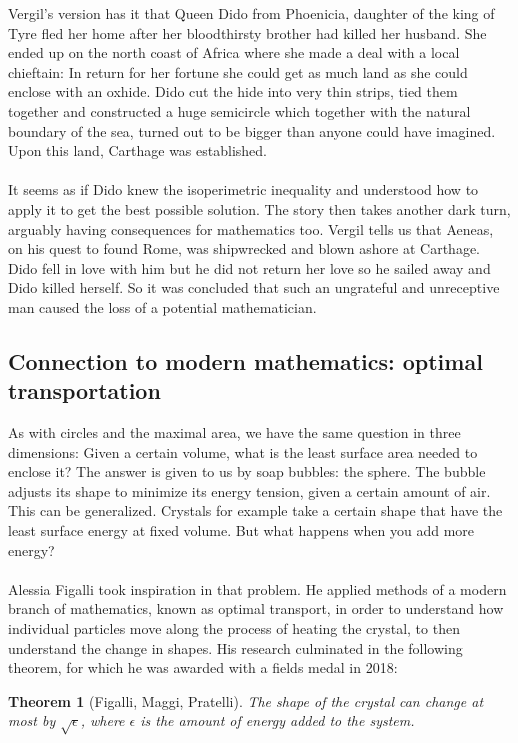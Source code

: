 \documentclass[12pt, a4paper, titlepage]{article}
\newtheorem{thm}{Theorem}
\begin{document}
Vergil's version has it that Queen Dido from Phoenicia, daughter of the king of Tyre fled her home after her bloodthirsty brother had killed her husband. She ended up on the north coast of Africa where she made a deal with a local chieftain: In return for her fortune she could get as much land as she could enclose with an oxhide. Dido cut the hide into very thin strips, tied them together and constructed a huge semicircle which together with the natural boundary of the sea, turned out to be bigger than anyone could have imagined. Upon this land, Carthage was established.\\\\
It seems as if Dido knew the isoperimetric inequality and understood how to apply it to get the best possible solution. 
The story then takes another dark turn,  arguably having consequences for mathematics too. Vergil tells us that Aeneas, on his quest to found Rome, was shipwrecked and blown ashore at Carthage. Dido fell in love with him but he did not return her love so he sailed away and Dido killed herself. So it was concluded that such an ungrateful and unreceptive man caused the loss of a potential mathematician.
\subsection{Connection to modern mathematics: optimal transportation}
As with circles and the maximal area, we have the same question in three dimensions: Given a certain volume, what is the least surface area needed to enclose it? The answer is given to us by soap bubbles: the sphere. The bubble adjusts its shape to minimize its energy tension, given a certain amount of air.
This can be generalized. Crystals for example take a certain shape that have the least surface energy at fixed volume. But what happens when you add more energy?\\
\\
Alessia Figalli took inspiration in that problem. He applied methods of a modern branch of mathematics, known as optimal transport, in order to understand how individual particles move along the process of heating the crystal, to then understand the change in shapes. His research culminated in the following theorem, for which he was awarded with a fields medal in 2018:
\begin{thm}[Figalli, Maggi, Pratelli]
The shape of the crystal can change at most by $\sqrt{\epsilon}$, where $\epsilon$ is the amount of energy added to the system.

\end{thm}
\end{document}
